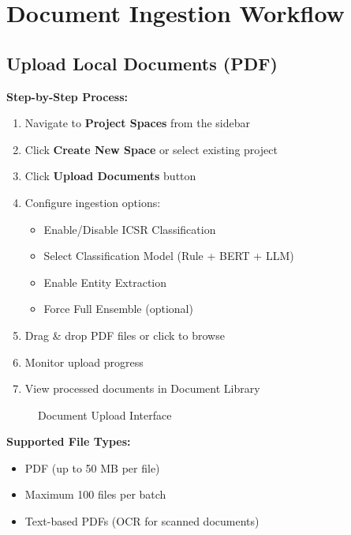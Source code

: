 \section{Document Ingestion Workflow}

\subsection{Upload Local Documents (PDF)}

\textbf{Step-by-Step Process:}

\begin{enumerate}
    \item Navigate to \textbf{Project Spaces} from the sidebar
    \item Click \textbf{Create New Space} or select existing project
    \item Click \textbf{Upload Documents} button
    \item Configure ingestion options:
    \begin{itemize}
        \item Enable/Disable ICSR Classification
        \item Select Classification Model (Rule + BERT + LLM)
        \item Enable Entity Extraction
        \item Force Full Ensemble (optional)
    \end{itemize}
    \item Drag \& drop PDF files or click to browse
    \item Monitor upload progress
    \item View processed documents in Document Library
\end{enumerate}

\begin{figure}[h]
\centering
{}
\caption{Document Upload Interface}
\label{fig:upload}
\end{figure}

\begin{commandbox}
\textbf{Supported File Types:}
\begin{itemize}[noitemsep]
    \item PDF (up to 50 MB per file)
    \item Maximum 100 files per batch
    \item Text-based PDFs (OCR for scanned documents)
\end{itemize}
\end{commandbox}


